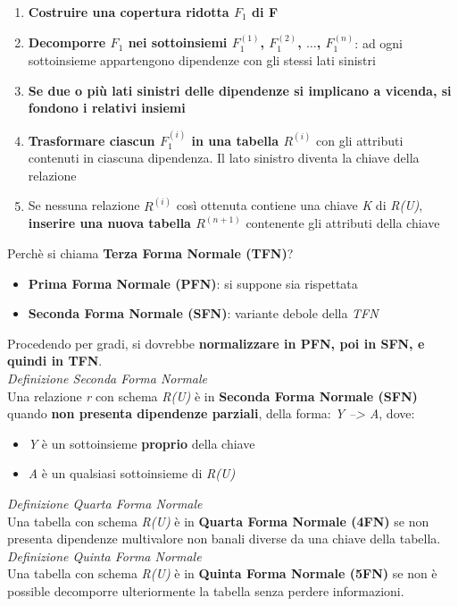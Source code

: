 \documentclass{article}
\begin{document}
\begin{enumerate}[leftmargin=1cm]
    \itemsep0em
    \item \textbf{Costruire una copertura ridotta $F_1$ di F}
    \item \textbf{Decomporre $F_1$ nei sottoinsiemi $F_1^{(1)}$, $F_1^{(2)}$, $\dots$, $F_1^{(n)}$}: ad ogni sottoinsieme appartengono dipendenze con gli stessi lati sinistri
    \item \textbf{Se due o più lati sinistri delle dipendenze si implicano a vicenda, si fondono i relativi insiemi}
    \item \textbf{Trasformare ciascun $F_1^{(i)}$ in una tabella $R^{(i)}$} con gli attributi contenuti in ciascuna dipendenza. Il lato sinistro diventa la chiave della relazione
    \item Se nessuna relazione $R^{(i)}$ così ottenuta contiene una chiave \textit{K} di \textit{R(U)}, \textbf{inserire una nuova tabella $R^{(n + 1)}$} contenente gli attributi della chiave\vspace{20pt}\\
\end{enumerate}
Perchè si chiama \textbf{Terza Forma Normale (TFN)}?
\begin{itemize}[label={-}, leftmargin=1cm]
    \itemsep0em
    \item \textbf{Prima Forma Normale (PFN)}: si suppone sia rispettata
    \item \textbf{Seconda Forma Normale (SFN)}: variante debole della \textit{TFN}
\end{itemize}
Procedendo per gradi, si dovrebbe \textbf{normalizzare in PFN, poi in SFN, e quindi in TFN}.\vspace{14pt}\\
\textit{Definizione Seconda Forma Normale}\\
Una relazione \textit{r} con schema \textit{R(U)} è in \textbf{Seconda Forma Normale (SFN)} quando \textbf{non presenta dipendenze parziali}, della forma: \textit{Y --> A}, dove:
\begin{itemize}[label={-}, leftmargin=1cm]
    \itemsep0em
    \item \textit{Y} è un sottoinsieme \textbf{proprio} della chiave
    \item \textit{A} è un qualsiasi sottoinsieme di \textit{R(U)}\\
\end{itemize}
\textit{Definizione Quarta Forma Normale}\\
Una tabella con schema \textit{R(U)} è in \textbf{Quarta Forma Normale (4FN)} se non presenta dipendenze multivalore non banali diverse da una chiave della tabella.\vspace{14pt}\\
\textit{Definizione Quinta Forma Normale}\\
Una tabella con schema \textit{R(U)} è in \textbf{Quinta Forma Normale (5FN)} se non è possible decomporre ulteriormente la tabella senza perdere informazioni.
\end{document}
